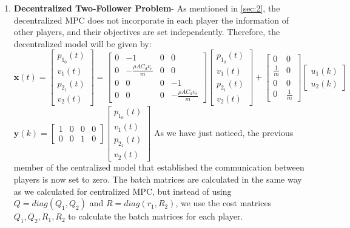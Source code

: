 \documentclass[a4paper,twocolumn]{article}
\newcommand{\bb}[1]{\mathbf{#1}}
\newcommand{\bvec}[1]{\bb{#1}}
\newcommand{\blkmat}[1]{\begin{bmatrix} #1 \end{bmatrix}}
\begin{document}
\begin{enumerate}[3.3]
    \item \textbf{Decentralized Two-Follower Problem}- As mentioned in \ref{sec:2}, the decentralized MPC does not incorporate in each player the information of other players, and their objectives are set independently. Therefore, the decentralized model will be given by:
    $\bvec{\Dot{x}}(t)=\blkmat{p_1_0(t) \\ v_1(t) \\ p_2_1(t) \\ v_2(t)}=    
	\begin{bmatrix}
    0 & -1 & 0 & 0\\
    0 &-\frac{\rho A C_d v_e}{m} & 0 & 0\\
    0 & 0 & 0 & -1\\
    0 & 0 & 0 & -\frac{\rho A C_d v_e}{m}
    \end{bmatrix}
    \blkmat{p_1_0(t) \\ v_1(t) \\ p_2_1(t) \\ v_2(t)}+
    \begin{bmatrix}
    0 & 0\\
    \frac{1}{m} & 0\\
    0 & 0\\
    0 & \frac{1}{m}
    \end{bmatrix}
    \begin{bmatrix}
    u_1(k)\\
    u_2(k)
    \end{bmatrix}$
    \newline
    $\bvec{y}(k)=
    \begin{bmatrix}
    1 & 0 & 0 & 0\\
    0 & 0 & 1 & 0
    \end{bmatrix}
    \blkmat{p_1_0(t) \\ v_1(t) \\ p_2_1(t) \\ v_2(t)}$\newline
    As we have just noticed, the previous member of the centralized model that established the communication between players is now set to zero.\newline
    The batch matrices are calculated in the same way as we calculated for centralized MPC, but instead of using $Q=diag(Q_1,Q_2)$ and $R=diag(r_1,R_2)$, we use the cost matrices $Q_1, Q_2, R_1, R_2$ to calculate the batch matrices for each player.
    
\end{enumerate}
\end{document}
